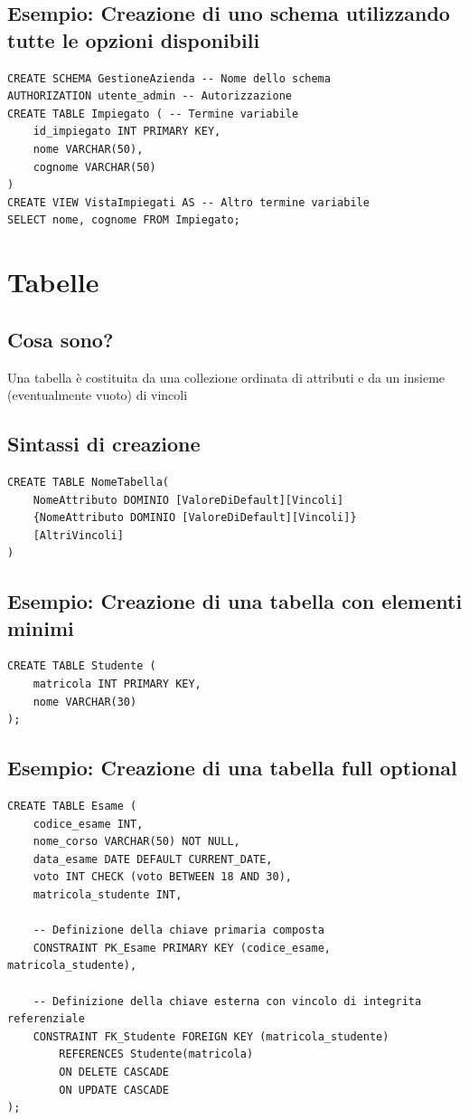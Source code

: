 \subsection{Esempio: Creazione di uno schema utilizzando tutte le opzioni disponibili}
\begin{lstlisting}[language=sql_generic]
CREATE SCHEMA GestioneAzienda -- Nome dello schema
AUTHORIZATION utente_admin -- Autorizzazione
CREATE TABLE Impiegato ( -- Termine variabile
    id_impiegato INT PRIMARY KEY,
    nome VARCHAR(50),
    cognome VARCHAR(50)
)
CREATE VIEW VistaImpiegati AS -- Altro termine variabile
SELECT nome, cognome FROM Impiegato;
\end{lstlisting}

\section{Tabelle}
\subsection{Cosa sono?}
Una tabella è costituita da una collezione ordinata di attributi e da un insieme (eventualmente vuoto) di vincoli
\subsection{Sintassi di creazione}
\begin{lstlisting}[language=sql_generic]
CREATE TABLE NomeTabella(
    NomeAttributo DOMINIO [ValoreDiDefault][Vincoli]
    {NomeAttributo DOMINIO [ValoreDiDefault][Vincoli]}
    [AltriVincoli]
)
\end{lstlisting}

\subsection{Esempio: Creazione di una tabella con elementi minimi}
\begin{lstlisting}[language=sql_generic]
CREATE TABLE Studente (
    matricola INT PRIMARY KEY,
    nome VARCHAR(30)
);
\end{lstlisting}
\subsection{Esempio: Creazione di una tabella full optional}
\begin{lstlisting}[language=sql_generic]
CREATE TABLE Esame (
    codice_esame INT,
    nome_corso VARCHAR(50) NOT NULL,
    data_esame DATE DEFAULT CURRENT_DATE,
    voto INT CHECK (voto BETWEEN 18 AND 30),
    matricola_studente INT,
    
    -- Definizione della chiave primaria composta
    CONSTRAINT PK_Esame PRIMARY KEY (codice_esame, matricola_studente),
    
    -- Definizione della chiave esterna con vincolo di integrita referenziale
    CONSTRAINT FK_Studente FOREIGN KEY (matricola_studente) 
        REFERENCES Studente(matricola)
        ON DELETE CASCADE
        ON UPDATE CASCADE
);
\end{lstlisting}

